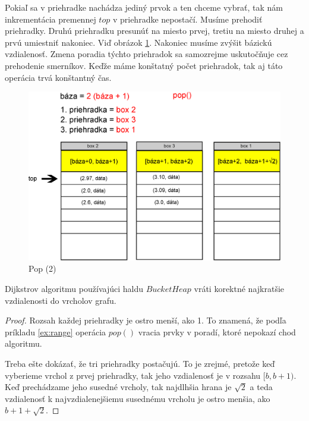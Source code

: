 Pokiaľ sa v priehradke nachádza jediný prvok a ten chceme vybrať, tak nám inkrementácia premennej $ top $ v priehradke 
nepostačí. Musíme prehodiť priehradky. Druhú priehradku presunúť
na miesto prvej, tretiu na miesto druhej a prvú umiestniť nakoniec. Viď obrázok \ref{fig:priehradky_i_d2}. Nakoniec musíme zvýšit bázickú vzdialenosť. Zmena poradia týchto priehradok sa samozrejme uskutočňuje cez prehodenie smerníkov.
Keďže máme konštatný počet priehradok, tak aj táto operácia
trvá konštantný čas.

\begin{figure}[h]
\centering
\includegraphics[width=\textwidth]{./img/priehradky_naplnene_default_i_d2.eps}
\caption{Pop (2)}
\label{fig:priehradky_i_d2}
\end{figure}


\begin{theorem}
Dijkstrov algoritmu používajúci haldu $BucketHeap$ vráti korektné najkratšie vzdialenosti do vrcholov grafu.
\end{theorem}
\begin{proof}
Rozsah každej priehradky je ostro menší, ako 1. To znamená, že podľa príkladu \ref{ex:range} operácia $pop()$ vracia prvky v poradí, ktoré
nepokazí chod algoritmu. 

Treba ešte dokázať, že tri priehradky postačujú. To je zrejmé,
pretože keď vyberieme vrchol z prvej priehradky, tak jeho vzdialenosť je v rozsahu $[b, b+1)$. Keď prechádzame jeho susedné vrcholy, tak najdlhšia hrana je $ \sqrt{2} $ a teda vzdialenosť k najvzdialenejšiemu susednému vrcholu je ostro menšia, ako $b+1+\sqrt{2}$.
\end{proof}


